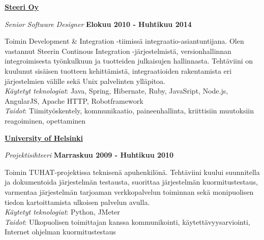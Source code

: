 \documentclass[10pt,finnish,a4paper]{article}
\newenvironment{outerlist}[1][\enskip\textbullet]%
        {\begin{itemize}[#1]}{\end{itemize}%
         \vspace{-.6\baselineskip}}
\newenvironment{innerlist}[1][\enskip\textbullet]%
        {\begin{compactitem}[#1]}{\end{compactitem}}
\newcommand{\blankline}{\quad\pagebreak[2]}
\begin{document}
\href{http://steeri.fi/}{\textbf{Steeri Oy}}
\begin{outerlist}

\item[] \textit{Senior Software Designer}
    \hfill \textbf{Elokuu 2010 - Huhtikuu 2014}
    \begin{innerlist}
		\item Toimin Development \& Integration -tiimissä integraatio-asiantuntijana. Olen vastannut Steerin Continous Integration -järjestelmistä, versionhallinnan integroimisesta työnkulkuun ja tuotteiden julkaisujen hallinnasta. Tehtäviini on kuulunut sisäisen tuotteen kehittämistä, integraatioiden rakentamista eri järjestelmien välille sekä Unix palvelinten ylläpitoa.\\


         \emph{Käytetyt teknologiat}: Java, Spring, Hibernate, Ruby, JavaSript, Node.js, AngularJS, Apache HTTP, Robotframework\\
         \emph{Taidot}: Tiimityöskentely, kommunikaatio, paineenhallinta, kriittisiin muutoksiin reagoiminen, opettaminen
    \end{innerlist}
\end{outerlist}
\blankline

\clearpage
\href{http://www.helsinki.fi/university/index.html}{\textbf{University of Helsinki}}
\begin{outerlist}

\item[] \textit{Projektisihteeri}%
    \hfill \textbf{Marraskuu 2009 - Huhtikuu 2010}
    \begin{innerlist}
        \item Toimin TUHAT-projektissa teknisenä apuhenkilönä. Tehtäviini kuului suunnitella ja dokumentoida järjestelmän testausta, suorittaa järjestelmän kuormitustestaus, varmentaa järjestelmän tarjoaman verkkopalvelun toiminnan sekä monipuolisen tiedon kartoittamista ulkoisen palvelun avulla.\\

        \emph{Käytetyt teknologiat}: Python, JMeter\\
        \emph{Taidot}: Ulkopuolisen toimittajan kanssa kommunikointi, käytettävyysarviointi, Internet ohjelman kuormitustestaus
    \end{innerlist}
\end{outerlist}
\blankline
\end{document}

